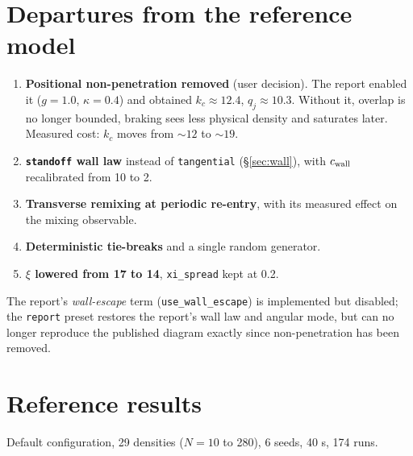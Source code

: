 \documentclass[11pt,a4paper]{article}
\newcommand{\code}[1]{\texttt{#1}}
\begin{document}
\section{Departures from the reference model}\label{sec:gaps}

\begin{enumerate}\itemsep3pt
\item \textbf{Positional non-penetration removed} (user decision). The report
      enabled it ($g=1.0$, $\kappa=0.4$) and obtained $k_c\approx12.4$,
      $q_j\approx10.3$. Without it, overlap is no longer bounded, braking sees
      less physical density and saturates later. Measured cost: $k_c$ moves from
      $\sim12$ to $\sim19$.
\item \textbf{\code{standoff} wall law} instead of \code{tangential}
      (\S\ref{sec:wall}), with $c_{\rm wall}$ recalibrated from 10 to 2.
\item \textbf{Transverse remixing at periodic re-entry}, with its measured
      effect on the mixing observable.
\item \textbf{Deterministic tie-breaks} and a single random generator.
\item \textbf{$\xi$ lowered from 17 to 14}, \code{xi\_spread} kept at 0.2.
\end{enumerate}

The report's \emph{wall-escape} term (\code{use\_wall\_escape}) is implemented
but disabled; the \code{report} preset restores the report's wall law and
angular mode, but can no longer reproduce the published diagram exactly since
non-penetration has been removed.

\section{Reference results}

Default configuration, 29 densities ($N=10$ to 280), 6 seeds, 40 s, 174 runs.
\end{document}
